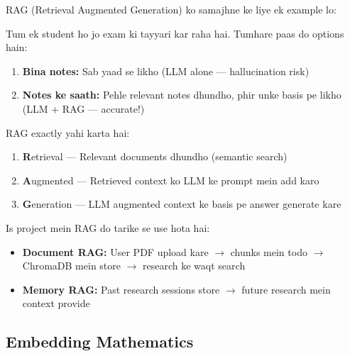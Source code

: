 \documentclass[12pt, a4paper]{article}
\begin{document}
\begin{storybox}
RAG (Retrieval Augmented Generation) ko samajhne ke liye ek example lo:

Tum ek student ho jo exam ki tayyari kar raha hai. Tumhare paas do options hain:
\begin{enumerate}
\item \textbf{Bina notes:} Sab yaad se likho (LLM alone --- hallucination risk)
\item \textbf{Notes ke saath:} Pehle relevant notes dhundho, phir unke basis pe likho (LLM + RAG --- accurate!)
\end{enumerate}

RAG exactly yahi karta hai:
\begin{enumerate}
\item \textbf{R}etrieval --- Relevant documents dhundho (semantic search)
\item \textbf{A}ugmented --- Retrieved context ko LLM ke prompt mein add karo
\item \textbf{G}eneration --- LLM augmented context ke basis pe answer generate kare
\end{enumerate}

Is project mein RAG do tarike se use hota hai:
\begin{itemize}
\item \textbf{Document RAG:} User PDF upload kare $\rightarrow$ chunks mein todo $\rightarrow$ ChromaDB mein store $\rightarrow$ research ke waqt search
\item \textbf{Memory RAG:} Past research sessions store $\rightarrow$ future research mein context provide
\end{itemize}
\end{storybox}

\subsection{Embedding Mathematics}
\end{document}
